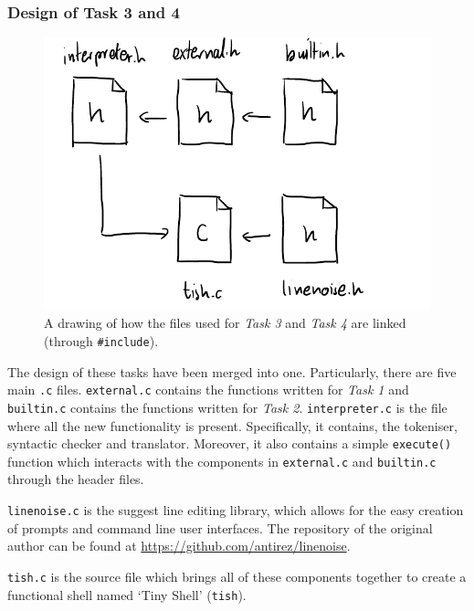 \documentclass[12pt]{article}
\begin{document}
\subsubsection{Design of Task 3 and 4}

\begin{figure}[H]
\centering
\includegraphics{task3arch}
\caption{A drawing of how the files used for \textit{Task 3} and
\textit{Task 4} are linked (through \texttt{\#include}).}
\end{figure}

The design of these tasks have been merged into one.
Particularly, there are five main \texttt{.c} files.
\texttt{external.c} contains the functions written for
\textit{Task 1} and \texttt{builtin.c} contains the functions
written for \textit{Task 2}. \texttt{interpreter.c} is the file
where all the new functionality is present. Specifically, it
contains, the tokeniser, syntactic checker and translator.
Moreover, it also contains a simple \texttt{execute()} function
which interacts with the components in \texttt{external.c} and
\texttt{builtin.c} through the header files.

\texttt{linenoise.c} is the suggest line editing library, which
allows for the easy creation of prompts and command line user
interfaces. The repository of the original author can be found
at \url{https://github.com/antirez/linenoise}.

\texttt{tish.c} is the source file which brings all of these
components together to create a functional shell named `Tiny
Shell' (\texttt{tish}).
\end{document}

